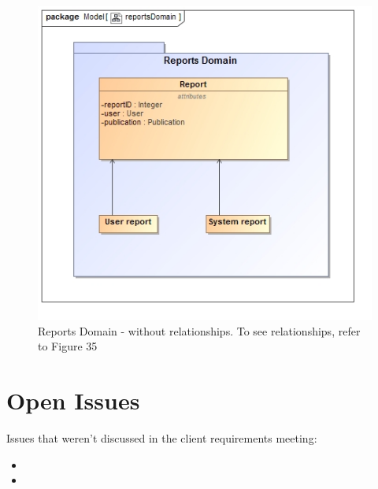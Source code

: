 \documentclass{article}
\begin{document}
			\begin{figure}[H]				
				\includegraphics[width=\linewidth]{../Diagrams/Domain Model/reportsDomain.jpg}
				\caption{ Reports Domain - without relationships. To see relationships, refer to Figure 35}
			\end{figure}
		
	\cleardoublepage
	\section{Open Issues}\label{sec:issues}
	Issues that weren't discussed in the client requirements meeting:
		\begin{itemize}
		  \item 
		  \item 
		\end{itemize}
		
\end{document}
